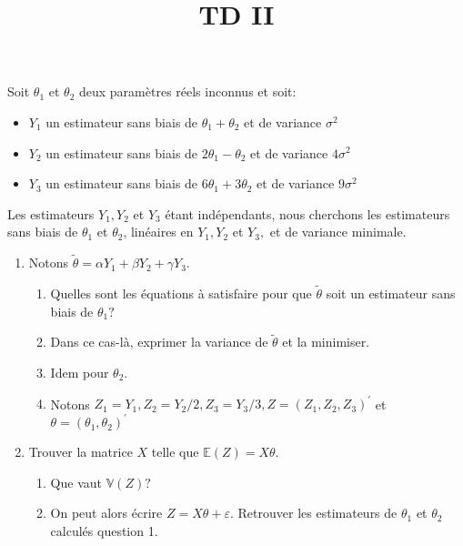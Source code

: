 \documentclass{td_um}
\title{TD II}
\providecommand{\1}{\mathds{1}}
\begin{document}
\maketitle


\exo{}  Soit $\theta_{1}$ et $\theta_{2}$ deux paramètres réels inconnus et soit:
\begin{itemize}
    \item    $Y_{1}$ un estimateur sans biais de $\theta_{1}+\theta_{2}$ et de variance $\sigma^{2}$
    \item    $Y_{2}$ un estimateur sans biais de $2 \theta_{1}-\theta_{2}$ et de variance $4 \sigma^{2}$ 
    \item    $Y_{3}$ un estimateur sans biais de $6 \theta_{1}+3 \theta_{2}$ et de variance $9 \sigma^{2}$ 
\end{itemize}
Les estimateurs $Y_{1}, Y_{2}$ et $Y_{3}$ étant indépendants, nous cherchons les estimateurs sans biais de $\theta_{1}$ et $\theta_{2}$, linéaires en $Y_{1}, Y_{2}$ et $Y_{3},$ et de variance minimale.
\begin{enumerate}
    \item Notons $\tilde{\theta}=\alpha Y_{1}+\beta Y_{2}+\gamma Y_{3}$.
        \begin{enumerate}
            \item Quelles sont les équations à satisfaire pour que $\tilde{\theta}$ soit un estimateur sans biais de $\theta_{1} ?$
            \item Dans ce cas-là, exprimer la variance de $\tilde{\theta}$ et la minimiser.
            \item Idem pour $\theta_{2}$.
            \item Notons $Z_{1}=Y_{1}, Z_{2}=Y_{2} / 2, Z_{3}=Y_{3} / 3, Z=\left(Z_{1}, Z_{2}, Z_{3}\right)^{\prime}$ et $\theta=\left(\theta_{1}, \theta_{2}\right)^{\prime}$
        \end{enumerate}
    \item Trouver la matrice $X$ telle que $\mathbb{E}(Z)=X \theta$.
        \begin{enumerate}
            \item Que vaut $\mathbb{V}(Z) ?$
            \item On peut alors écrire $Z=X \theta+\varepsilon .$ Retrouver les estimateurs de $\theta_{1}$ et $\theta_{2}$ calculés question 1.
    \end{enumerate}
\end{enumerate}

\cor{\newpage}
\end{document}
